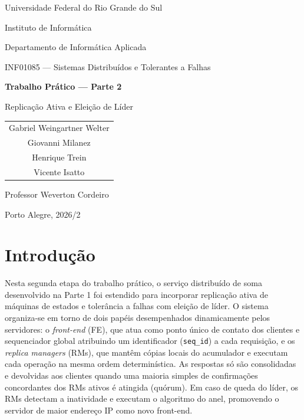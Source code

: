 \documentclass[12pt,a4paper]{article}
\newcommand{\arquivo}[1]{\texttt{#1}}
\begin{document}
\begin{titlepage}
    \centering
    {\large Universidade Federal do Rio Grande do Sul\par}
    {\large Instituto de Informática\par}
    {\large Departamento de Informática Aplicada\par}
    \vspace{2.5cm}

    {\Large INF01085 --- Sistemas Distribuídos e Tolerantes a Falhas\par}
    \vspace{1.5cm}
    {\huge\bfseries Trabalho Prático --- Parte 2\par}
    \vspace{0.4cm}
    {\LARGE Replicação Ativa e Eleição de Líder\par}

    \vfill
    \begin{tabular}{c}
        Gabriel Weingartner Welter \\
        Giovanni Milanez \\
        Henrique Trein \\
        Vicente Isatto
    \end{tabular}

    \vfill
    Professor Weverton Cordeiro

    \vspace{1cm}
    Porto Alegre, 2026/2
\end{titlepage}


\section{Introdução}

Nesta segunda etapa do trabalho prático, o serviço distribuído de soma desenvolvido na Parte 1 foi estendido para incorporar replicação ativa de máquinas de estados e tolerância a falhas com eleição de líder. O sistema organiza-se em torno de dois papéis desempenhados dinamicamente pelos servidores: o \textit{front-end} (FE), que atua como ponto único de contato dos clientes e sequenciador global atribuindo um identificador (\arquivo{seq\_id}) a cada requisição, e os \textit{replica managers} (RMs), que mantêm cópias locais do acumulador e executam cada operação na mesma ordem determinística. As respostas só são consolidadas e devolvidas aos clientes quando uma maioria simples de confirmações concordantes dos RMs ativos é atingida (quórum). Em caso de queda do líder, os RMs detectam a inatividade e executam o algoritmo do anel, promovendo o servidor de maior endereço IP como novo front-end.
\end{document}
